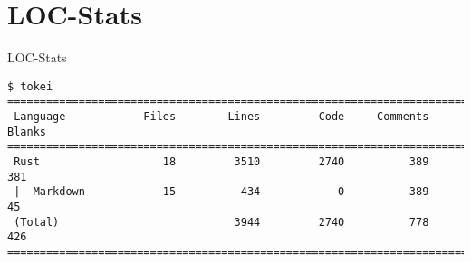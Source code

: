 \section{LOC-Stats}
\begin{frame}[c,fragile]{LOC-Stats}
    \large
    \centering
    \begin{verbatim}
$ tokei
===============================================================================
 Language            Files        Lines         Code     Comments       Blanks
===============================================================================
 Rust                   18         3510         2740          389          381
 |- Markdown            15          434            0          389           45
 (Total)                           3944         2740          778          426
===============================================================================
    \end{verbatim}
\end{frame}
